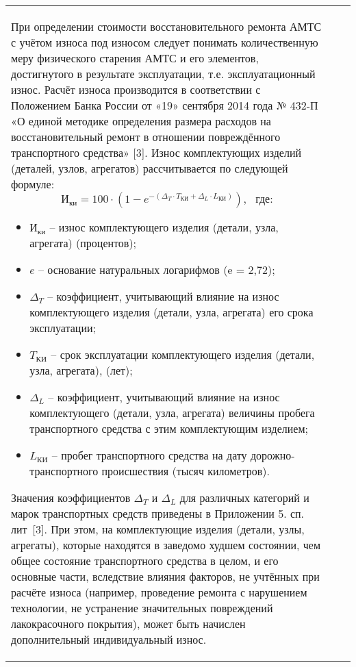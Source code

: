\begin{longtable}{G{3mm}|M{90mm}|G{60mm}}
	\par При определении стоимости восстановительного ремонта АМТС с учётом износа под износом следует понимать количественную меру физического старения АМТС и его элементов, достигнутого в результате эксплуатации, т.е. эксплуатационный износ.
	Расчёт износа производится в  соответствии с Положением Банка России от «19» сентября 2014 года № 432-П «О единой методике определения размера расходов на восстановительный ремонт в отношении повреждённого транспортного средства» [3].
	Износ комплектующих изделий (деталей, узлов, агрегатов) рассчитывается по следующей формуле:
	\begin{equation}\label{eq:I}
		\text{И}_{\text{ки}} 
		= 100\cdot\left( 1-e^ {-\left( \Delta_{T} \cdot T_{\text{КИ}} + \Delta_{L} \cdot L_{\text{КИ}} \right)}\right), \,\,\,\,\text{где:}   
	\end{equation}
	\begin{itemize}
		\item[ ]$ \text{И}_{\text{ки}} $ -- износ комплектующего изделия (детали, узла, агрегата) (процентов); 
		\item[ ]$ e $ -- основание натуральных логарифмов (e =  2,72);
		\item[ ]$ \Delta_{T}$ --  коэффициент, учитывающий влияние на износ комплектующего 	изделия (детали, узла, агрегата) его срока эксплуатации;
		\item[ ]$ T_{\text{КИ}} $ -- срок эксплуатации комплектующего изделия (детали, узла, агрегата), (лет);
		\item[ ]$ \Delta_{L} $ -- коэффициент, учитывающий влияние на износ комплектующего (детали, узла, агрегата) величины пробега транспортного средства с этим комплектующим изделием;
		\item[ ]$ L_{\text{КИ}} $ -- пробег транспортного средства на дату дорожно-транспортного происшествия (тысяч километров).  
	\end{itemize}
	\vspace{5mm}
	\par Значения коэффициентов $ \Delta_{T}$  и $ \Delta_{L} $  для различных категорий и марок транспортных средств приведены в Приложении 5. сп. лит~[3]. При этом, на комплектующие изделия (детали, узлы, агрегаты), которые находятся в заведомо худшем состоянии, чем общее состояние транспортного средства в целом, и его основные части, вследствие влияния факторов, не учтённых при расчёте износа (например, проведение ремонта с нарушением технологии, не устранение значительных повреждений лакокрасочного покрытия), может быть начислен дополнительный индивидуальный износ. 

\end{longtable}

